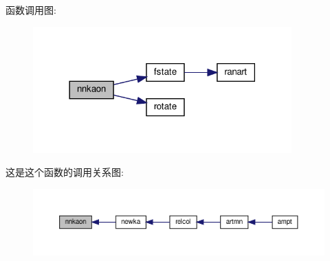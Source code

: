 函数调用图\+:
\nopagebreak
\begin{figure}[H]
\begin{center}
\leavevmode
\includegraphics[width=282pt]{nnkaon_8f90_a61308853c27c4189497a76a98542bba0_cgraph}
\end{center}
\end{figure}
这是这个函数的调用关系图\+:
\nopagebreak
\begin{figure}[H]
\begin{center}
\leavevmode
\includegraphics[width=350pt]{nnkaon_8f90_a61308853c27c4189497a76a98542bba0_icgraph}
\end{center}
\end{figure}
